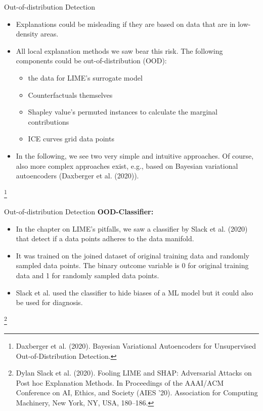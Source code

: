 \documentclass[11pt,compress,t,notes=noshow, xcolor=table]{beamer}
\begin{document}
\begin{vbframe}{Out-of-distribution Detection}
	\begin{itemize}
		\item Explanations could be misleading if they are based on data that are in low-density areas.
		\item All local explanation methods we saw bear this risk. The following components could be out-of-distribution (OOD): 
		\begin{itemize}
			\item the data for LIME's surrogate model
			\item Counterfactuals themselves
			\item Shapley value's permuted instances to calculate the marginal contributions 
			\item ICE curves grid data points 
		\end{itemize}
		\item In the following, we see two very simple and intuitive approaches. Of course, also more complex approaches exist, e.g., based on Bayesian variational autoencoders (Daxberger et al. (2020)).
	\end{itemize}
\footnote[frame]{Daxberger et al. (2020). Bayesian Variational Autoencoders for Unsupervised Out-of-Distribution Detection.}
\end{vbframe}


\begin{vbframe}{Out-of-distribution Detection}
	\textbf{OOD-Classifier:} 
	\begin{itemize}
		\item In the chapter on LIME's pitfalls, we saw a classifier by Slack et al. (2020) that detect if a data points adheres to the data manifold. 
		\item It was trained on the joined dataset of original training data and randomly sampled data points. 
		The binary outcome variable is 0 for original training data and 1 for randomly sampled data points. 
		\item Slack et al. used the classifier to hide biases of a ML model but it could also be used for diagnosis.  
	\end{itemize}
	\footnote[frame]{Dylan Slack et al. (2020). Fooling LIME and SHAP: Adversarial Attacks on Post hoc Explanation Methods. In Proceedings of the AAAI/ACM Conference on AI, Ethics, and Society (AIES '20). Association for Computing Machinery, New York, NY, USA, 180–186.}
\end{vbframe}
\end{document}
